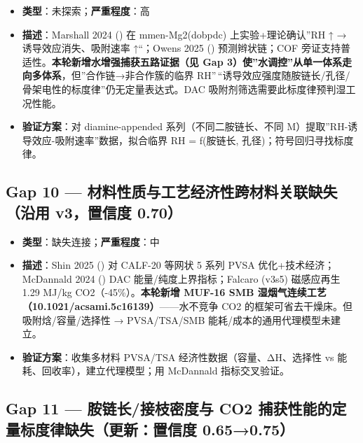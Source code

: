 \documentclass[12pt,a4paper]{ctexart}
\providecommand{\tightlist}{%
  \setlength{\itemsep}{0pt}\setlength{\parskip}{0pt}}
\begin{document}
\begin{itemize}
\tightlist
\item
  \textbf{类型}：未探索；\textbf{严重程度}：高
\item
  \textbf{描述}：Marshall 2024 (\cite{p35}) 在 mmen-Mg2(dobpdc) 上实验+理论确认''RH ↑ → 诱导效应消失、吸附速率 ↑``；Owens 2025 (\cite{p24}) 预测辫状链；COF 旁证支持普适性。\textbf{本轮新增水增强捕获五路证据（见 Gap 3）使''水调控''从单一体系走向多体系}，但''合作链→非合作簇的临界 RH''\,``诱导效应强度随胺链长/孔径/骨架电性的标度律''仍无定量表达式。DAC 吸附剂筛选需要此标度律预判湿工况性能。
\item
  \textbf{验证方案}：对 diamine-appended 系列（不同二胺链长、不同 M）提取''RH-诱导效应-吸附速率''数据，拟合临界 RH = f(胺链长, 孔径)；符号回归寻找标度律。
\end{itemize}

\subsection{Gap 10 --- 材料性质与工艺经济性跨材料关联缺失（沿用 v3，置信度 0.70）}\label{gap:gap-10-ux6750ux6599ux6027ux8d28ux4e0eux5de5ux827aux7ecfux6d4eux6027ux8de8ux6750ux6599ux5173ux8054ux7f3aux5931ux6cbfux7528-v3ux7f6eux4fe1ux5ea6-0.70}

\begin{itemize}
\tightlist
\item
  \textbf{类型}：缺失连接；\textbf{严重程度}：中
\item
  \textbf{描述}：Shin 2025 (\cite{p23}) 对 CALF-20 等网状 5 系列 PVSA 优化+技术经济；McDannald 2024 (\cite{p32}) DAC 能量/纯度上界指标；Falcaro (v3s5) 磁感应再生 1.29 MJ/kg CO2（-45\%）。\textbf{本轮新增 MUF-16 SMB 湿烟气连续工艺（10.1021/acsami.5c16139）}------水不竞争 CO2 的框架可省去干燥床。但吸附焓/容量/选择性 → PVSA/TSA/SMB 能耗/成本的通用代理模型未建立。
\item
  \textbf{验证方案}：收集多材料 PVSA/TSA 经济性数据（容量、ΔH、选择性 vs 能耗、回收率），建立代理模型；用 McDannald 指标交叉验证。
\end{itemize}

\subsection{Gap 11 --- 胺链长/接枝密度与 CO2 捕获性能的定量标度律缺失（更新：置信度 0.65→0.75）}\label{gap:gap-11-ux80faux94feux957fux63a5ux679dux5bc6ux5ea6ux4e0e-co2-ux6355ux83b7ux6027ux80fdux7684ux5b9aux91cfux6807ux5ea6ux5f8bux7f3aux5931ux66f4ux65b0ux7f6eux4fe1ux5ea6-0.650.75}
\end{document}
